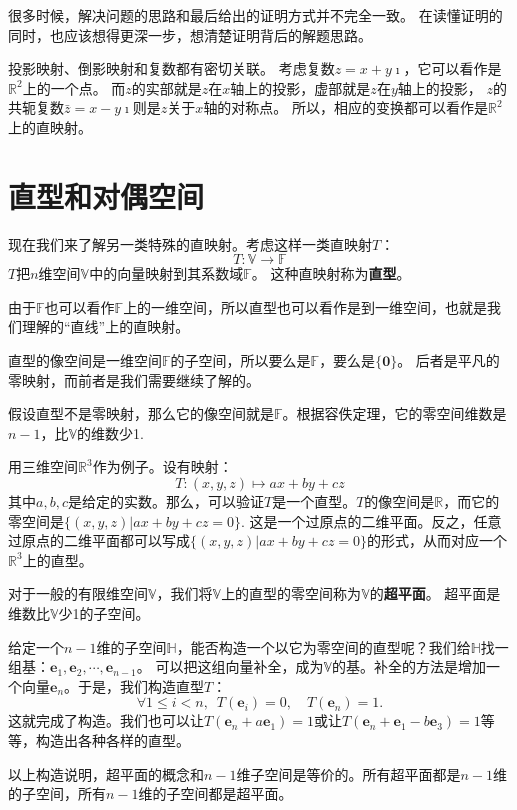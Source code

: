 \documentclass[12pt,UTF8]{ctexbook}
\begin{document}
很多时候，解决问题的思路和最后给出的证明方式并不完全一致。
在读懂证明的同时，也应该想得更深一步，想清楚证明背后的解题思路。

投影映射、倒影映射和复数都有密切关联。
考虑复数$z = x+y\imath $，它可以看作是$\mathbb{R}^2$上的一个点。
而$z$的实部就是$z$在$x$轴上的投影，虚部就是$z$在$y$轴上的投影，
$z$的共轭复数$\bar{z}=x-y\imath $则是$z$关于$x$轴的对称点。
所以，相应的变换都可以看作是$\mathbb{R}^2$上的直映射。

\section{直型和对偶空间}
现在我们来了解另一类特殊的直映射。考虑这样一类直映射$T$：
$$  T : \mathbb{V} \rightarrow \mathbb{F}  $$
$T$把$n$维空间$\mathbb{V}$中的向量映射到其系数域$\mathbb{F}$。
这种直映射称为\textbf{直型}。

由于$\mathbb{F}$也可以看作$\mathbb{F}$上的一维空间，所以直型也可以看作是到一维空间，也就是我们理解的“直线”上的直映射。

直型的像空间是一维空间$\mathbb{F}$的子空间，所以要么是$\mathbb{F}$，要么是$\{\mathbf{0}\}$。
后者是平凡的零映射，而前者是我们需要继续了解的。

假设直型不是零映射，那么它的像空间就是$\mathbb{F}$。根据容佚定理，它的零空间维数是$n-1$，比$\mathbb{V}$的维数少1.

用三维空间$\mathbb{R}^3$作为例子。设有映射：
$$T : (x,y,z) \mapsto ax + by + cz$$
其中$a,b,c$是给定的实数。那么，可以验证$T$是一个直型。$T$的像空间是$\mathbb{R}$，而它的零空间是$\{(x,y,z) | ax+by+cz = 0\}$. 
这是一个过原点的二维平面。反之，任意过原点的二维平面都可以写成$\{(x,y,z) | ax+by+cz = 0\}$的形式，从而对应一个$\mathbb{R}^3$上的直型。

对于一般的有限维空间$\mathbb{V}$，我们将$\mathbb{V}$上的直型的零空间称为$\mathbb{V}$的\textbf{超平面}。
超平面是维数比$\mathbb{V}$少1的子空间。

给定一个$n-1$维的子空间$\mathbb{H}$，能否构造一个以它为零空间的直型呢？我们给$\mathbb{H}$找一组基：$\mathbf{e}_1, \mathbf{e}_2, \cdots, \mathbf{e}_{n-1}$。
可以把这组向量补全，成为$\mathbb{V}$的基。补全的方法是增加一个向量$\mathbf{e}_n$。于是，我们构造直型$T$：
$$ \forall 1 \leqslant i < n, \,\,\, T(\mathbf{e}_i)= 0, \quad T(\mathbf{e}_n)= 1. $$
这就完成了构造。我们也可以让$T(\mathbf{e}_n + a\mathbf{e}_1)= 1$或让$T(\mathbf{e}_n + \mathbf{e}_1 - b\mathbf{e}_3)= 1$等等，构造出各种各样的直型。

以上构造说明，超平面的概念和$n-1$维子空间是等价的。所有超平面都是$n-1$维的子空间，所有$n-1$维的子空间都是超平面。
\end{document}

